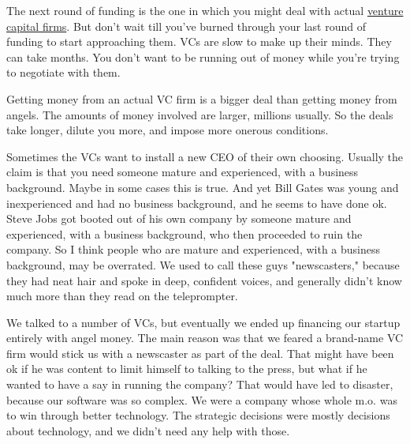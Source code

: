 The next round of funding is the one in
                    which you might deal with actual
                    \href{http://www.paulgraham.com/venturecapital.html}{venture capital firms}. But
                    don't wait till you've burned through your last round of
                    funding to start approaching them. VCs are slow to make up
                    their minds. They can take months. You don't want to be
                    running out of money while you're trying to negotiate with
                    them.

Getting money from an actual VC firm is a
                    bigger deal than getting money from angels. The amounts of
                    money involved are larger, millions usually. So the deals
                    take longer, dilute you more, and impose more onerous
                    conditions.

Sometimes the VCs want to install a
                    new CEO of their own choosing. Usually the claim is that you
                    need someone mature and experienced, with a business
                    background. Maybe in some cases this is true. And yet Bill
                    Gates was young and inexperienced and had no business
                    background, and he seems to have done ok. Steve Jobs got
                    booted out of his own company by someone mature and
                    experienced, with a business background, who then proceeded
                    to ruin the company. So I think people who are mature and
                    experienced, with a business background, may be overrated.
                    We used to call these guys "newscasters," because they had
                    neat hair and spoke in deep, confident voices, and generally
                    didn't know much more than they read on the teleprompter.

We
                    talked to a number of VCs, but eventually we ended up
                    financing our startup entirely with angel money. The main
                    reason was that we feared a brand-name VC firm would stick
                    us with a newscaster as part of the deal. That might have
                    been ok if he was content to limit himself to talking to the
                    press, but what if he wanted to have a say in running the
                    company? That would have led to disaster, because our
                    software was so complex. We were a company whose whole m.o.
                    was to win through better technology. The strategic
                    decisions were mostly decisions about technology, and we
                    didn't need any help with those.

